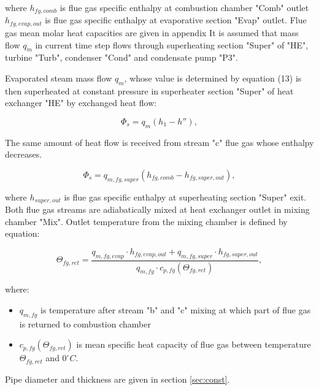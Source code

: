 \documentclass[openany]{book}
\begin{document}
	\noindent
	where 
	$h_{fg,comb}$ is flue gas specific enthalpy at combustion chamber "Comb" 
	outlet
	$h_{fg,evap,out}$ is flue gas specific enthalpy at evaporative section 
	"Evap" outlet.
	Flue gas mean molar heat capacities are given in appendix
	It is assumed that mass flow $q_m$ in current time step flows through 
	superheating section "Super" of "HE", turbine "Turb", condenser "Cond" and 
	condensate pump "P3".
	
	Evaporated steam mass flow $q_m$, whose value is determined by equation 
	(13) is then superheated at constant pressure in superheater section 
	"Super" of heat exchanger "HE" by exchanged heat flow:
	
	\begin{equation}\label{eq:evap_steam_mass3}
	\Phi_s = q_m(h_1 - h''),
	\end{equation}
	
	The same amount of heat flow is received from stream "c" flue gas whose 
	enthalpy decreases.
	
	\begin{equation}\label{eq:evap_steam_mass4}
	\Phi_s = q_{m,fg,super} (h_{fg,comb} - h_{fg,super,out}),
	\end{equation}
	
	\noindent
	where $h_{super,out}$ is flue gas specific enthalpy at superheating section 
	"Super" exit. Both flue gas streams are adiabatically mixed at heat 
	exchanger outlet in mixing chamber "Mix". Outlet temperature from the 
	mixing chamber is defined by equation:
	
	\begin{equation}\label{eq:outlet_temp}
	\Theta_{fg,ret} = \frac{q_{m,fg,evap} \cdot h_{fg,evap,out} + 
	q_{m,fg,super} \cdot h_{fg,super,out}}{q_{m,fg} \cdot c_{p,fg} 
	(\Theta_{fg,ret})},
	\end{equation}
	
	\noindent
	where:
	
	\begin{itemize}
		\item $q_{m,fg}$ is temperature after stream "b" and "c" mixing at 
		which part of flue gas is returned to combustion chamber
		\item $c_{p,fg} (\Theta_{fg,ret})$ is mean specific heat capacity of 
		flue gas between temperature $\Theta_{fg,ret}$ and $0^{\circ}C$.
	\end{itemize}
	
	Pipe diameter and thickness are given in section \ref{sec:const}.
	
\end{document}
